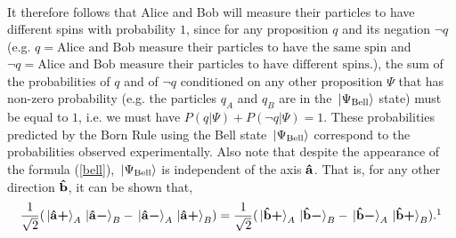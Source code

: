 {\begin{equation*}
\begin{split}
\end{split}
\end{equation*}
It therefore follows that Alice and Bob will measure their particles to have different spins with probability $1$, since for any proposition $q$ and its negation $\neg q$ (e.g. $q = \text{Alice and Bob measure their particles to have the same spin}$ and $\neg q = \text{Alice and Bob measure their particles to have different spins.}$), the sum of the probabilities of $q$ and of $\neg q$ conditioned on any other proposition $\Psi$ that has non-zero probability (e.g. the particles $q_A$ and $q_B$ are in the $\ket*{\Psi_{\text{Bell}}}$ state) must be equal to $1$, i.e. we must have $P(q|\Psi)+P(\neg q|\Psi)=1.$} 
These probabilities predicted by the Born Rule using the Bell state $\ket*{\Psi_{\text{Bell}}}$ correspond to the probabilities observed experimentally. Also note that despite the appearance of the formula (\ref{bell}), $\ket*{\Psi_{\text{Bell}}}$ is independent of the axis $\vb{\hat{{a}}}$. That is, for any other direction $\vb{\hat{{b}}}$, it can be shown that,
\begin{equation}\label{bellstate2}\frac{1}{\sqrt{2}}(\ket*{\uvbp{a}}_A\ket*{\uvbm{a}}_B-\ket*{\uvbm{a}}_A\ket*{\uvbp{a}}_B)=\frac{1}{\sqrt{2}}(\ket*{\uvbp{b}}_A\ket*{\uvbm{b}}_B-\ket*{\uvbm{b}}_A\ket*{\uvbp{b}}_B).\protect\footnotemark\end{equation}
